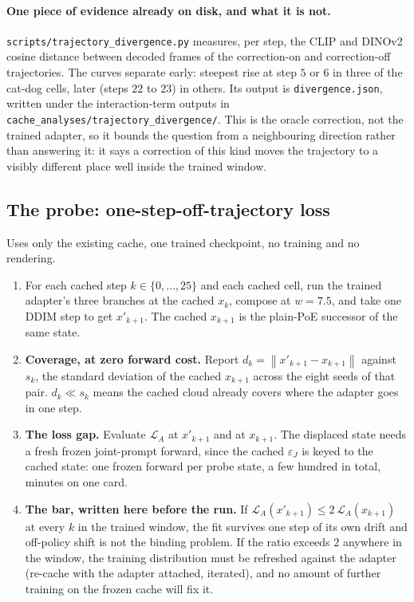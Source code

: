 \documentclass[11pt]{article}
\newcommand{\eps}{\varepsilon}
\newcommand{\norm}[1]{\left\lVert #1 \right\rVert}
\theoremstyle{plain}
\theoremstyle{remark}
\begin{document}
\paragraph{One piece of evidence already on disk, and what it is not.}
\texttt{scripts/}\allowbreak\texttt{trajectory\_divergence.py} measures, per step, the CLIP and DINOv2 cosine distance
between decoded frames of the correction-on and correction-off trajectories. The curves separate
early: steepest rise at step $5$ or $6$ in three of the cat-dog cells, later (steps $22$ to $23$)
in others. Its output is \texttt{divergence.json}, written under the interaction-term
outputs in \texttt{cache\_analyses/}\allowbreak\texttt{trajectory\_divergence/}. This is
the oracle correction, not the trained adapter, so it bounds the question from a neighbouring
direction rather than answering it: it says a correction of this kind moves the trajectory to a
visibly different place well inside the trained window.

\subsection{The probe: one-step-off-trajectory loss}

Uses only the existing cache, one trained checkpoint, no training and no rendering.

\begin{enumerate}
  \item For each cached step $k \in \{0,\dots,25\}$ and each cached cell, run the trained adapter's
    three branches at the cached $x_k$, compose at $w = 7.5$, and take one DDIM step to get
    $x'_{k+1}$. The cached $x_{k+1}$ is the plain-PoE successor of the same state.
  \item \textbf{Coverage, at zero forward cost.} Report
    $d_k = \norm{x'_{k+1} - x_{k+1}}$ against $s_k$, the standard deviation of the cached $x_{k+1}$
    across the eight seeds of that pair. $d_k \ll s_k$ means the cached cloud already covers where
    the adapter goes in one step.
  \item \textbf{The loss gap.} Evaluate $\mathcal{L}_A$ at $x'_{k+1}$ and at $x_{k+1}$. The
    displaced state needs a fresh frozen joint-prompt forward, since the cached $\eps_J$ is keyed to
    the cached state: one frozen forward per probe state, a few hundred in total, minutes on one
    card.
  \item \textbf{The bar, written here before the run.} If
    $\mathcal{L}_A(x'_{k+1}) \le 2\,\mathcal{L}_A(x_{k+1})$ at every $k$ in the trained window, the
    fit survives one step of its own drift and off-policy shift is not the binding problem. If the
    ratio exceeds $2$ anywhere in the window, the training distribution must be refreshed against the
    adapter (re-cache with the adapter attached, iterated), and no amount of further training on the
    frozen cache will fix it.
\end{enumerate}
\end{document}

